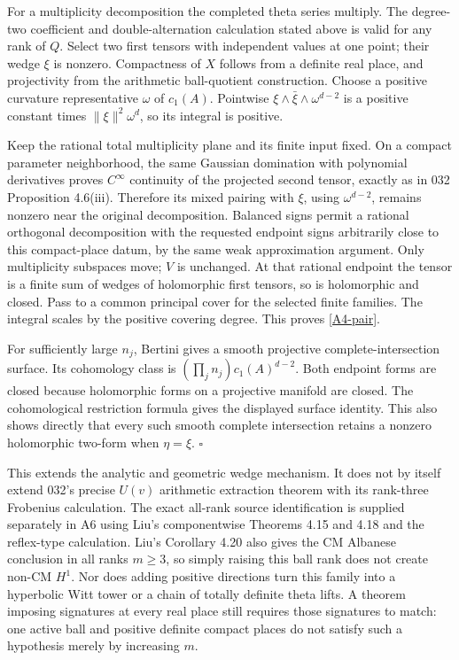 \documentclass[11pt]{article}
\theoremstyle{definition}\newtheorem{definition}[theorem]{Definition}\newtheorem{remark}[theorem]{Remark}
\begin{document}
For a multiplicity decomposition the completed theta series multiply.
The degree-two coefficient and double-alternation calculation stated
above is valid for any rank of $Q$. Select two first tensors with
independent values at one point; their wedge $\xi$ is nonzero.
Compactness of $X$ follows from a definite real place, and projectivity
from the arithmetic ball-quotient construction. Choose a positive
curvature representative $\omega$ of $c_1(A)$. Pointwise
$\xi\wedge\bar\xi\wedge\omega^{d-2}$ is a positive constant
times $\|\xi\|^2\omega^d$, so its integral is positive.

Keep the rational total multiplicity plane and its finite input fixed.
On a compact parameter neighborhood, the same Gaussian domination
with polynomial derivatives proves $C^\infty$ continuity of the
projected second tensor, exactly as in 032 Proposition 4.6(iii).
Therefore its mixed pairing with $\xi$, using $\omega^{d-2}$, remains
nonzero near the original decomposition. Balanced signs permit a
rational orthogonal decomposition with the requested endpoint signs
arbitrarily close to this compact-place datum, by the same weak
approximation argument. Only multiplicity subspaces move; $V$ is
unchanged. At that rational endpoint the tensor is a finite sum of
wedges of holomorphic first tensors, so is holomorphic and closed.
Pass to a common principal cover for the selected finite families.
The integral scales by the positive covering degree. This proves
\eqref{A4-pair}.

For sufficiently large $n_j$, Bertini gives a smooth projective
complete-intersection surface. Its cohomology class is
$(\prod_jn_j)c_1(A)^{d-2}$. Both endpoint forms are closed because
holomorphic forms on a projective manifold are closed. The
cohomological restriction formula gives the displayed surface
identity. This also shows directly that every such smooth complete
intersection retains a nonzero holomorphic two-form when $\eta=\xi$.
$\square$

This extends the analytic and geometric wedge mechanism. It does not
by itself extend 032's precise $U(v)$ arithmetic extraction theorem
with its rank-three Frobenius calculation. The exact all-rank source
identification is supplied separately in A6 using Liu's componentwise
Theorems 4.15 and 4.18 and the reflex-type calculation. Liu's
Corollary 4.20 also gives the CM Albanese conclusion in
all ranks $m\geq3$, so simply raising this ball rank does not create
non-CM $H^1$. Nor does adding positive directions turn this family
into a hyperbolic Witt tower or a chain of totally definite theta
lifts. A theorem imposing signatures at every real place still
requires those signatures to match: one active ball and positive
definite compact places do not satisfy such a hypothesis merely by
increasing $m$.
\end{document}
